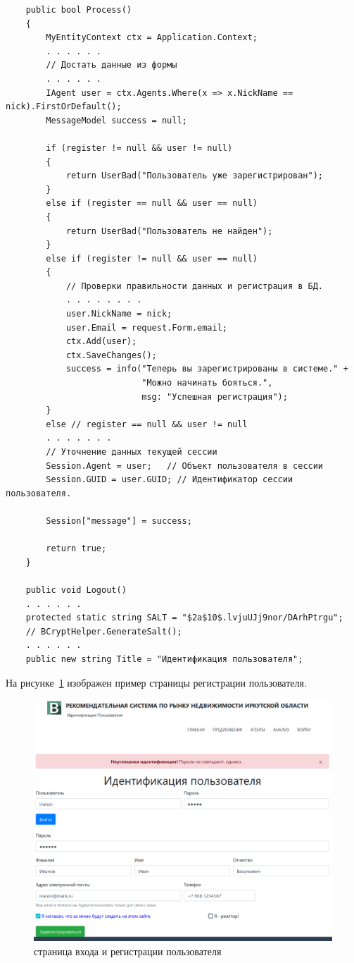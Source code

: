 \documentclass[a4paper,14pt,openany,final]{extreport} %
\begin{document}
{\begin{verbatim}
    public bool Process()
    {
        MyEntityContext ctx = Application.Context;
        . . . . . .
        // Достать данные из формы
        . . . . . .
        IAgent user = ctx.Agents.Where(x => x.NickName == nick).FirstOrDefault();
        MessageModel success = null;

        if (register != null && user != null)
        {
            return UserBad("Пользователь уже зарегистрирован");
        }
        else if (register == null && user == null)
        {
            return UserBad("Пользователь не найден");
        }
        else if (register != null && user == null)
        {
            // Проверки правильности данных и регистрация в БД.
            . . . . . . . .
            user.NickName = nick;
            user.Email = request.Form.email;
            ctx.Add(user);
            ctx.SaveChanges();
            success = info("Теперь вы зарегистрированы в системе." +
                           "Можно начинать бояться.",
                           msg: "Успешная регистрация");
        }
        else // register == null && user != null
        . . . . . . .
        // Уточнение данных текущей сессии
        Session.Agent = user;   // Объект пользователя в сессии
        Session.GUID = user.GUID; // Идентификатор сессии пользователя.

        Session["message"] = success;

        return true;
    }

    public void Logout()
    . . . . . .
    protected static string SALT = "$2a$10$.lvjuUJj9nor/DArhPtrgu";
    // BCryptHelper.GenerateSalt();
    . . . . . .
    public new string Title = "Идентификация пользователя";
\end{verbatim}

На рисунке~\ref{fig:loginregister} изображен пример страницы регистрации пользователя.

\begin{figure}[htbp]
  \centering
  \includegraphics[width=0.8\linewidth]{screen-login.png}
  \caption{страница входа и регистрации пользователя}
  \label{fig:loginregister}
\end{figure}

}
\end{document}
